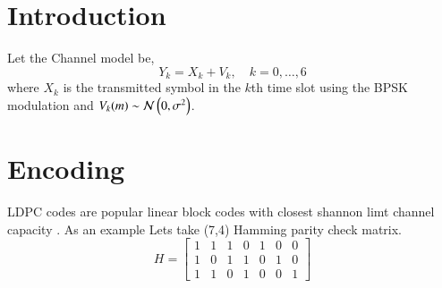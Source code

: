 \documentclass[journal,12pt,twocolumn]{IEEEtran}
\begin{document}
\section{Introduction}
Let the Channel model be,
\begin{equation}
Y_k= X_k + V_k, \quad k = 0,\dots,6
\end{equation} 
where $X_k$ is the  transmitted symbol in the $k$th time slot using the BPSK modulation and $V_k(m) \sim \mathcal{N}\left(0,\sigma^2\right) $. 

\section{Encoding}
 LDPC codes are popular linear block codes with closest shannon limt channel capacity \cite{ldpc}. As an example Lets take (7,4) Hamming parity check matrix.
 \begin{equation} \label{eq:H}
 H =  \begin{bmatrix} 
1 & 1 & 1 & 0 & 1 & 0 & 0 \\
1 & 0 & 1 & 1 & 0 & 1 & 0 \\
1 & 1 & 0 & 1 & 0 & 0 & 1 
\end{bmatrix}
 \end{equation}
\end{document}
